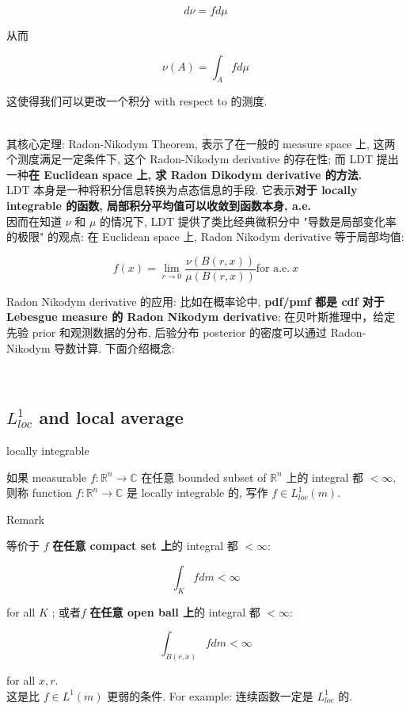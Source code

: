 \documentclass{qlnotes-export}
\begin{document}
\[d\nu = fd\mu\]

从而

\[\nu(A) = \int_{A}f d\mu\]

这使得我们可以更改一个积分 with respect to 的测度.\\
\strut \\
其核心定理: Radon-Nikodym Theorem, 表示了在一般的 measure space 上, 这两个测度满足一定条件下, 这个 Radon-Nikodym derivative 的存在性; 而 LDT 提出一种\textbf{在 Euclidean space 上, 求 Radon Dikodym derivative 的方法.}\\
LDT 本身是一种将积分信息转换为点态信息的手段. 它表示\textbf{对于 locally integrable 的函数, 局部积分平均值可以收敛到函数本身, a.e.}\\
因而在知道 \(\nu\) 和 \(\mu\) 的情况下, LDT 提供了类比经典微积分中 "导数是局部变化率的极限" 的观点: 在 Euclidean space 上, Radon Nikodym derivative 等于局部均值:

\[f(x) = \lim\limits_{r\rightarrow 0}\frac{\nu(B(r,x))}{\mu(B(r,x))}\text{for a.e.}\ x\]

Radon Nikodym derivative 的应用: 比如在概率论中, \textbf{pdf/pmf 都是 cdf 对于 Lebesgue measure 的 Radon Nikodym derivative}; 在贝叶斯推理中，给定先验 prior 和观测数据的分布, 后验分布 posterior 的密度可以通过 Radon-Nikodym 导数计算. 下面介绍概念:\\
\strut \\

\subsection{\texorpdfstring{\(L_{loc}^{1}\) and local average}{L\_\{loc\}\^{}\{1\} and local average}}\label{l_loc1-and-local-average}

\begin{definition}{locally integrable}\label{def-08-hardy-littlewood-ldt-locally-integrable}

如果 measurable \(f:{\mathbb{R}}^{n}\rightarrow{\mathbb{C}}\) 在任意 bounded subset of \({\mathbb{R}}^{n}\) 上的 integral 都 \(< \infty\), 则称 function \(f:{\mathbb{R}}^{n}\rightarrow{\mathbb{C}}\) 是 locally integrable 的, 写作 \(f \in L_{loc}^{1}(m)\).

\end{definition}

\begin{qlremark}{Remark}

等价于 \(f\) \textbf{在任意 compact set 上}的 integral 都 \(< \infty\):

\[\int_{K}f dm < \infty\]

for all \(K\) ; 或者\(f\) \textbf{在任意 open ball 上}的 integral 都 \(< \infty\):

\[\int_{B(r,x)}f dm < \infty\]

for all \(x,r\).\\
这是比 \(f \in L^{1}(m)\) 更弱的条件. For example: 连续函数一定是 \(L_{loc}^{1}\) 的.

\end{qlremark}
\end{document}
